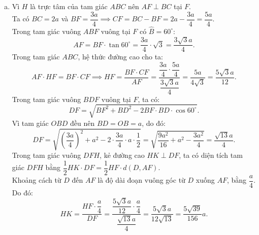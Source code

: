 \begin{bt}
{\begin{enumerate}[a)]
	Ta có $\widehat{ODI} = \widehat{ODB} + \widehat{BDC} - \widehat{IDH} = 90^\circ$, suy ra $DI$ là tiếp tuyến của đường tròn $(O)$ tại tiếp điểm $D$.\\
	Vì $MD$ và $MC$ là hai tiếp tuyến của $(O)$ nên $MO$ là tia phân giác của góc $\widehat{DOC}$.\\
	Góc ở tâm $\widehat{DOC} = 180^\circ - \widehat{BOD} = 180^\circ - 60^\circ = 120^\circ \implies \widehat{COM} = \dfrac{120^\circ}{2} = 60^\circ$.\\
	Trong tam giác vuông $OCM$ vuông tại $C$:
	$$ \cos \widehat{COM} = \dfrac{OC}{OM} \implies \cos 60^\circ = \dfrac{OC}{OM} = \dfrac{1}{2} \implies OM = 2OC. $$
	\item Vì $H$ là trực tâm của tam giác $ABC$ nên $AF \perp BC$ tại $F$.\\
	Ta có $BC = 2a$ và $BF = \dfrac{3a}{4} \implies CF = BC - BF = 2a - \dfrac{3a}{4} = \dfrac{5a}{4}$.\\
	Trong tam giác vuông $ABF$ vuông tại $F$ có $\widehat{B} = 60^\circ$:
	$$ AF = BF \cdot \tan 60^\circ = \dfrac{3a}{4} \cdot \sqrt{3} = \dfrac{3\sqrt{3}a}{4}. $$
	Trong tam giác $ABC$, hệ thức đường cao cho ta:
	$$ AF \cdot HF = BF \cdot CF \implies HF = \dfrac{BF \cdot CF}{AF} = \dfrac{\dfrac{3a}{4} \cdot \dfrac{5a}{4}}{\dfrac{3\sqrt{3}a}{4}} = \dfrac{5a}{4\sqrt{3}} = \dfrac{5\sqrt{3}a}{12}. $$
	Trong tam giác vuông $BDF$ vuông tại $F$, ta có:
	$$ DF = \sqrt{BF^2 + BD^2 - 2BF \cdot BD \cdot \cos 60^\circ}. $$
	Vì tam giác $OBD$ đều nên $BD = OB = a$, do đó:
	$$ DF = \sqrt{\left(\dfrac{3a}{4}\right)^2 + a^2 - 2 \cdot \dfrac{3a}{4} \cdot a \cdot \dfrac{1}{2}} = \sqrt{\dfrac{9a^2}{16} + a^2 - \dfrac{3a^2}{4}} = \dfrac{\sqrt{13}a}{4}. $$
	Trong tam giác vuông $DFH$, kẻ đường cao $HK \perp DF$, ta có diện tích tam giác $DFH$ bằng $\dfrac{1}{2}HK \cdot DF = \dfrac{1}{2}HF \cdot d(D, AF)$.\\
	Khoảng cách từ $D$ đến $AF$ là độ dài đoạn vuông góc từ $D$ xuống $AF$, bằng $\dfrac{a}{4}$.\\
	Do đó:
	$$ HK = \dfrac{HF \cdot \dfrac{a}{4}}{DF} = \dfrac{\dfrac{5\sqrt{3}a}{12} \cdot \dfrac{a}{4}}{\dfrac{\sqrt{13}a}{4}} = \dfrac{5\sqrt{3}a}{12\sqrt{13}} = \dfrac{5\sqrt{39}}{156}a. $$
\end{enumerate}
}
\end{bt}
